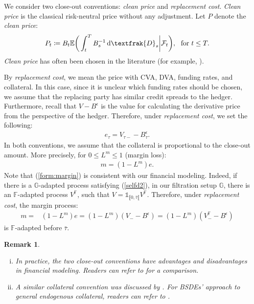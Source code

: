 \documentclass[a4paper, 11pt]{article}              %
\numberwithin{equation}{section}
\theoremstyle{plain}
\newcommand{\btau}{\bar{\tau}}
\newcommand{\1}{\mathds{1}}
\newcommand{\calF}{\mathcal{F}}
\newcommand{\frD}{\textfrak{D}}
\newcommand{\dsE}{\mathbb{E}}
\newcommand{\dsF}{\mathbb{F}}
\newcommand{\dsG}{\mathbb{G}}
\theoremstyle{plain}
\theoremstyle{definition}
\newtheorem{remark}[thm]{Remark} %
\theoremstyle{plain}
\newtheorem{remark}{Remark}
\newcommand*\df{\mathop{}\!\mathrm{d}}
\begin{document}
We consider two close-out conventions: \textit{clean price} and
\textit{replacement cost}. \textit{Clean price} is the classical risk-neutral
price without any adjustment. Let $P$ denote the \textit{clean price}:
\begin{align}
  P_t \coloneqq B_t\dsE\bigg(\int_{t}^{T}B_s^{-1}\df \frD_s\bigg\vert\calF_t\bigg),~~
   \text{for }t\leq T. \label{def:cleanprice}
\end{align}
\textit{Clean price}  has often been chosen
in the literature (for example,  \cite{crepey2015bilateral1,
  crepey2015bilateral2}).

By \textit{replacement cost}, we mean the price with CVA, DVA, funding rates,
and collateral. In this case, since it is unclear which funding rates should be
chosen, we assume that the replacing party has similar credit spreads to the
hedger. Furthermore, recall that $V-B^\epsilon$ is the value for calculating the
derivative price from the perspective of the hedger. Therefore, under \textit{replacement
  cost}, we set the following: 
\begin{align}
  e_{\tau}=V_{\tau-}-B^\epsilon_{\tau}. \nonumber
\end{align}
In both conventions, we assume that the collateral is proportional to
the close-out amount. More precisely, for $0\leq L^m \leq1$ (margin loss):
\begin{align}
m =(1-L^m)e. \label{form:margin}
\end{align}
Note that (\ref{form:margin}) is consistent with our financial modeling. Indeed,
if there is a $\dsG$-adapted process satisfying (\ref{selfd2}), in our 
filtration setup $\dsG$, there is an $\dsF$-adapted process $V^\dsF$, such that
  $V = \1_{\llbracket 0, \btau \llbracket}V^\dsF$. 
Therefore, under \textit{replacement cost}, the margin process:
\begin{align}
  m =& (1-L^m)e = (1-L^m)(V_- -B^\epsilon) = (1-L^m)(V^\dsF_- -B^\epsilon) \nonumber 
\end{align}
is $\dsF$-adapted before $\btau$. 
\begin{remark}
\begin{enumerate}[(i)]
\item In practice, the two close-out conventions have advantages and
  disadvantages in financial modeling.  Readers can refer to
  \cite{brigo2011close} for a comparison.
\item A similar collateral convention was discussed by
  \cite{burgard2010partial}. For BSDEs' approach to general endogenous
  collateral, readers can refer to \cite{nie2016bsde}.    
\end{enumerate}
  
\end{remark}
\end{document}
